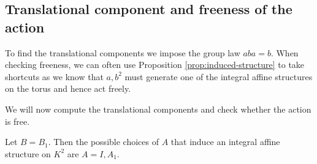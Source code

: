 \subsection{Translational component and freeness of the action}
To find the translational components we impose the group law $aba = b$. When
checking freeness, we can often use Proposition \ref{prop:induced-structure} to
take shortcuts as we know that $a,b^2$ must generate one of the integral affine
structures on the torus and hence act freely.

We will now compute the translational components and check whether the action
is free.

\begin{lemma}
    Let $B = B_1$. Then the possible choices of $A$ that induce an integral affine structure on $K^2$ are
    $A=I, A_1$.
\end{lemma}
